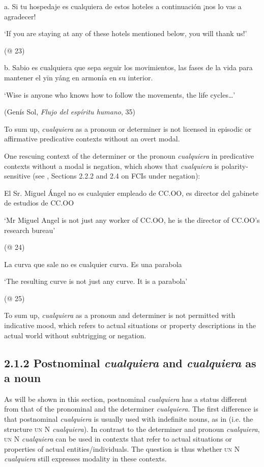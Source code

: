   \label{bkm:Ref57364726}a.  Si tu hospedaje es cualquiera de estos hoteles a continuación ¡nos lo vas a agradecer!

    ‘If you are staying at any of these hotels mentioned below, you will thank us!’

    (@ 23)

  b.  Sabio es cualquiera que sepa seguir los movimientos, las fases de la vida para mantener el yīn yáng en armonía en su interior.

    ‘Wise is anyone who knows how to follow the movements, the life cycles…’ 

    (Genís Sol, \textit{Flujo del espíritu humano}, 35)

To sum up, \textit{cualquiera} as a pronoun or determiner is not licensed in episodic or affirmative predicative contexts without an overt modal. 

  One rescuing context of the determiner or the pronoun \textit{cualquiera} in predicative contexts without a modal is negation, which shows that \textit{cualquiera} is polarity-sensitive (see \citealt{Chierchia2006}, Sections 2.2.2 and 2.4 on FCIs under negation):

  El Sr. Miguel Ángel no es cualquier empleado de CC.OO, es director del gabinete de estudios de CC.OO

  ‘Mr Miguel Angel is not just any worker of CC.OO, he is the director of CC.OO’s research bureau’

  (@ 24)

  La curva que sale no es cualquier curva. Es una parabola

  ‘The resulting curve is not just any curve. It is a parabola’

  (@ 25)

To sum up, \textit{cualquiera} as a pronoun and determiner is not permitted with indicative mood, which refers to actual situations or property descriptions in the actual world without subtrigging or negation.

\subsection{\textbf{2.1.2} \textbf{Postnominal} \textbf{\textit{cualquiera}}\textbf{ }\textbf{and} \textbf{\textit{cualquiera}} \textbf{as} \textbf{a} \textbf{noun}}

As will be shown in this section, postnominal \textit{cualquiera} has a status different from that of the pronominal and the determiner \textit{cualquiera}. The first difference is that postnominal \textit{cualquiera} is usually used with indefinite nouns, as in  (i.e. the structure \textsc{un} N \textit{cualquiera}). In contrast to the determiner and pronoun \textit{cualquiera}, \textsc{un} N \textit{cualquiera} can be used in contexts that refer to actual situations or properties of actual entities/individuals. The question is thus whether \textsc{un} N \textit{cualquiera} still expresses modality in these contexts.


